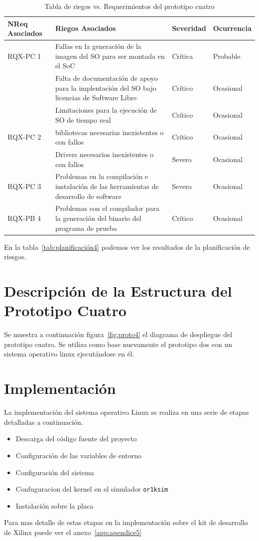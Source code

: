 		\begin{table}[h!]
		\centering
		\begin{tabular}{ p{2.5cm} p{9cm} p{1.5cm} p{2cm} }
		\hline 
		\rowcolor[gray]{0.8} N\textordmasculine Req Asociados  & Riegos Asociados & Severidad  & Ocurrencia \\
		\hline RQX-PC 1 & Fallas en la generación de la imagen del SO para ser montada en el SoC & Crítica       & Probable \\
		\hline			& Falta de documentación de apoyo para la implentación del SO bajo licencias de Software Libre & Crítico & Ocasional\\	
		\hline			& Limitaciones para la ejecución de SO de tiempo real & Crítico & Ocasional\\	
 		\hline RQX-PC 2 & bibliotecas necesarias inexistentes o con fallos& Crítico & Ocasional\\	
		\hline			& Drivers necesarios inexistentes o con fallos  & Severo  &  Ocasional\\ 
		\hline RQX-PC 3	& Problemas en la compilación e instalación de las herramientas de desarrollo de software& Severo  &  Ocasional\\ 
		\hline RQX-PB 4 & Problemas con el compilador para la generación del binario del programa de prueba  & Crítico&  Ocasional\\
		\hline
		\end{tabular}
		\caption{Tabla de riegos vs. Requerimientos del prototipo cuatro}
		\label{tab:riegos4}
		\end{table}

En la tabla~\ref{tab:planificación4} podemos ver los resultados de la planificación de riesgos.

\section{Descripción de la Estructura del Prototipo Cuatro}
		Se muestra a continuación figura~\ref{fig:proto4} el diagrama de despliegue del prototipo cuatro. Se utiliza como base nuevamente el prototipo
		dos con un sistema operativo linux ejecutándose en él.

\section{Implementación}	
		
La implementación del sistema operativo Linux se realiza en una serie de etapas detalladas a continuación. 
		\begin {itemize}
		\item Descarga del código fuente del proyecto
		\item Configuración de las variables de entorno
		\item Configuración del sistema
		\item Confuguracion del kernel en el simulador \verb|or1ksim|
		\item Instalación sobre la placa 
		\end {itemize}
Para mas detalle de estas etapas en la implementación sobre el kit de desarrollo de Xilinx puede ver el anexo~\ref{app:apendice5}

